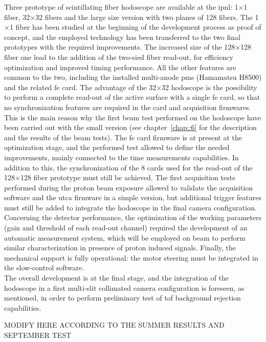 Three prototype of scintillating fiber hodoscope are available at the \gls{ipnl}: 1$\times$1 fiber, 32$\times$32 fibers and the large size version with two planes of 128 fibers. The 1$\times$1 fiber has been studied at the beginning of the development process as proof of concept, and the employed technology has been transferred to the two final prototypes with the required improvements. The increased size of the 128$\times$128 fiber one lead to the addition of the two-sied fiber read-out, for efficiency optimization and improved timing performance. All the other features are common to the two, including the installed multi-anode \glspl{pm} (Hamamatsu H8500) and the related \gls{fe} card. The advantage of the 32$\times$32 hodoscope is the possibility to perform a complete read-out of the active surface with a single \gls{fe} card, so that no synchronization features are required in the card and acquisition firmwares. This is the main reason why the first beam test performed on the hodoscope have been carried out with the small version (see chapter~\ref{chap::6} for the description and the results of the beam tests). The \gls{fe} card firmware is at present at the optimization stage, and the performed test allowed to define the needed improvements, mainly connected to the time measurements capabilities. In addition to this, the synchronization of the 8 cards used for the read-out of the 128$\times$128 fiber prototype must still be achieved. The first acquisition tests performed during the proton beam exposure allowed to validate the acquisition software and the \gls{utca} firmware in a simple version, but additional trigger features must still be added to integrate the hodoscope in the final camera configuration. Concerning the detector performance, the optimization of the working parameters (gain and threshold of each read-out channel) required the development of an automatic measurement system, which will be employed on beam to perform similar characterization in presence of proton induced signals. Finally, the mechanical support is fully operational: the motor steering must be integrated in the slow-control software.\\
The overall development is at the final stage, and the integration of the hodoscope in a first multi-slit collimated camera configuration is foreseen, as mentioned, in order to perform preliminary test of \gls{tof} background rejection capabilities.

MODIFY HERE ACCORDING TO THE SUMMER RESULTS AND SEPTEMBER TEST       

